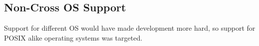 \documentclass[12pt,a4paper]{article}
\begin{document}
\subsection{Non-Cross OS Support}
Support for different OS would have made development more
hard, so support for POSIX alike operating systems was targeted.



\end{document}
